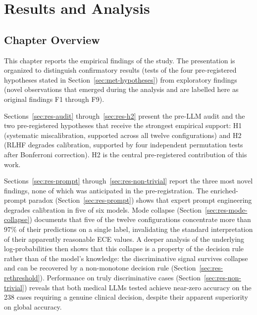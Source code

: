 %

\chapter{Results and Analysis}
\label{chap:results}

\section{Chapter Overview}
\label{sec:res-overview}

This chapter reports the empirical findings of the study. The presentation 
is organized to distinguish confirmatory results (tests of the four 
pre-registered hypotheses stated in Section~\ref{sec:met-hypotheses}) from 
exploratory findings (novel observations that emerged during the analysis 
and are labelled here as original findings F1 through F9).

Sections~\ref{sec:res-audit} through~\ref{sec:res-h2} present the 
pre-LLM audit and the two pre-registered hypotheses that receive the 
strongest empirical support: H1 (systematic miscalibration, supported 
across all twelve configurations) and H2 (RLHF degrades calibration, 
supported by four independent permutation tests after Bonferroni 
correction). H2 is the central pre-registered contribution of this 
work.

Sections~\ref{sec:res-prompt} through~\ref{sec:res-non-trivial} report 
the three most novel findings, none of which was anticipated in the 
pre-registration. The enriched-prompt paradox 
(Section~\ref{sec:res-prompt}) shows that expert prompt engineering 
degrades calibration in five of six models. Mode collapse 
(Section~\ref{sec:res-mode-collapse}) documents that five of the twelve 
configurations concentrate more than 97\% of their predictions on a 
single label, invalidating the standard interpretation of their 
apparently reasonable ECE values. A deeper analysis of the underlying 
log-probabilities then shows that this collapse is a property of the 
decision rule rather than of the model's knowledge: the discriminative 
signal survives collapse and can be recovered by a non-monotone decision 
rule (Section~\ref{sec:res-rethreshold}). Performance on truly 
discriminative cases (Section~\ref{sec:res-non-trivial}) reveals that 
both medical LLMs tested achieve near-zero accuracy on the 238 cases 
requiring a genuine clinical decision, despite their apparent superiority 
on global accuracy.

